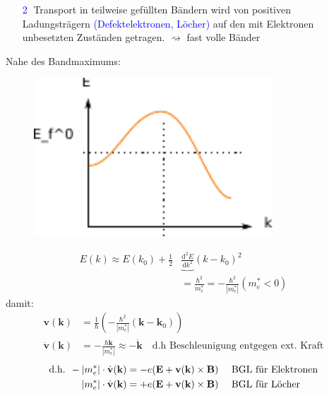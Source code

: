\begin{itemize}
\begin{itemize}
            \item[\textcolor{blue}{\textcircled{2}}] Transport in teilweise gefüllten Bändern wird von positiven Ladungsträgern \textcolor{blue}{(Defektelektronen, Löcher)} auf den mit Elektronen unbesetzten Zuständen getragen. $\rightsquigarrow$ fast volle Bänder
        \end{itemize}
        Nahe des Bandmaximums:
        \begin{figure}[H]
            \centering
            \includegraphics[width=0.8\textwidth]{figures/6_3Band.pdf}
            \caption{}
            \label{fig:6_3Band}
        \end{figure}
        \begin{align*}
            E(k) \approx E(k_0) + \frac{1}{2} &\underbrace{ \frac{\mathrm{d}^2E}{\mathrm{d}k^2}} (k-k_0)^2 \\
            &= \frac{\hbar^2}{m_e^*} = -\frac{\hbar^2}{|m_e^*|} (m_e^* < 0)
        \end{align*}
        damit:
        \begin{align*}
            \textbf{v}(\textbf{k}) &= \frac{1}{\hbar} \left(-\frac{\hbar^2}{|m_e^*|}(\textbf{k}-\textbf{k}_0)\right) \\
            \dot{\textbf{v}}(\textbf{k}) &= - \frac{\hbar \dot{\textbf{k}}}{|m_e^*|} \approx - \dot{\textbf{k}} \quad \text{d.h Beschleunigung entgegen ext. Kraft}
        \end{align*}
        \begin{align*}
            \text{d.h. } - |m_e^*| \cdot \dot{\textbf{v}}(\textbf{k}) &= - e (\textbf{E} + \textbf{v}(\textbf{k}) \times \textbf{B}) {\color{red} \quad \text{ BGL für Elektronen}} \\
         |m_e^*| \cdot \dot{\textbf{v}}(\textbf{k}) &= + e (\textbf{E} + \textbf{v}(\textbf{k}) \times \textbf{B}) \quad {\color{blue}\text{  BGL für Löcher}}

\end{align*}
\end{itemize}

